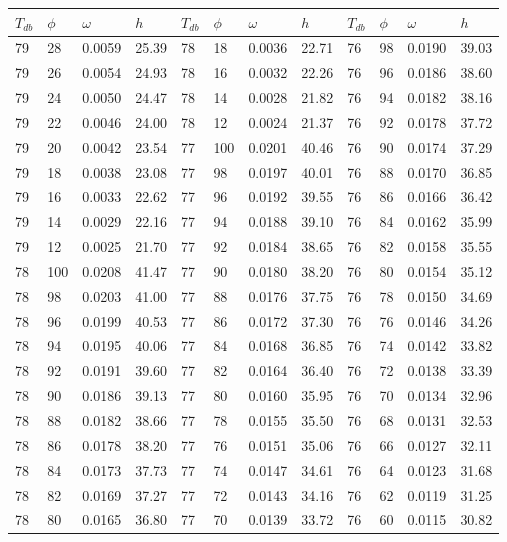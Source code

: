 \begin{tabular}{llll|llll|llll}
 \toprule 
\(T_{db}\) & \(\phi\) & \(\omega\) & \(h\) & \(T_{db}\) & \(\phi\) & \(\omega\) & \(h\) & \(T_{db}\) & \(\phi\) & \(\omega\) & \(h\)  \\ \midrule 
79 & 28 & 0.0059 & 25.39 & 78 & 18 & 0.0036 & 22.71 & 76 & 98 & 0.0190 & 39.03\\
79 & 26 & 0.0054 & 24.93 & 78 & 16 & 0.0032 & 22.26 & 76 & 96 & 0.0186 & 38.60\\
79 & 24 & 0.0050 & 24.47 & 78 & 14 & 0.0028 & 21.82 & 76 & 94 & 0.0182 & 38.16\\
79 & 22 & 0.0046 & 24.00 & 78 & 12 & 0.0024 & 21.37 & 76 & 92 & 0.0178 & 37.72\\
79 & 20 & 0.0042 & 23.54 & 77 & 100 & 0.0201 & 40.46 & 76 & 90 & 0.0174 & 37.29\\
79 & 18 & 0.0038 & 23.08 & 77 & 98 & 0.0197 & 40.01 & 76 & 88 & 0.0170 & 36.85\\
79 & 16 & 0.0033 & 22.62 & 77 & 96 & 0.0192 & 39.55 & 76 & 86 & 0.0166 & 36.42\\
79 & 14 & 0.0029 & 22.16 & 77 & 94 & 0.0188 & 39.10 & 76 & 84 & 0.0162 & 35.99\\
79 & 12 & 0.0025 & 21.70 & 77 & 92 & 0.0184 & 38.65 & 76 & 82 & 0.0158 & 35.55\\
78 & 100 & 0.0208 & 41.47 & 77 & 90 & 0.0180 & 38.20 & 76 & 80 & 0.0154 & 35.12\\
78 & 98 & 0.0203 & 41.00 & 77 & 88 & 0.0176 & 37.75 & 76 & 78 & 0.0150 & 34.69\\
78 & 96 & 0.0199 & 40.53 & 77 & 86 & 0.0172 & 37.30 & 76 & 76 & 0.0146 & 34.26\\
78 & 94 & 0.0195 & 40.06 & 77 & 84 & 0.0168 & 36.85 & 76 & 74 & 0.0142 & 33.82\\
78 & 92 & 0.0191 & 39.60 & 77 & 82 & 0.0164 & 36.40 & 76 & 72 & 0.0138 & 33.39\\
78 & 90 & 0.0186 & 39.13 & 77 & 80 & 0.0160 & 35.95 & 76 & 70 & 0.0134 & 32.96\\
78 & 88 & 0.0182 & 38.66 & 77 & 78 & 0.0155 & 35.50 & 76 & 68 & 0.0131 & 32.53\\
78 & 86 & 0.0178 & 38.20 & 77 & 76 & 0.0151 & 35.06 & 76 & 66 & 0.0127 & 32.11\\
78 & 84 & 0.0173 & 37.73 & 77 & 74 & 0.0147 & 34.61 & 76 & 64 & 0.0123 & 31.68\\
78 & 82 & 0.0169 & 37.27 & 77 & 72 & 0.0143 & 34.16 & 76 & 62 & 0.0119 & 31.25\\
78 & 80 & 0.0165 & 36.80 & 77 & 70 & 0.0139 & 33.72 & 76 & 60 & 0.0115 & 30.82\\

\end{tabular}
